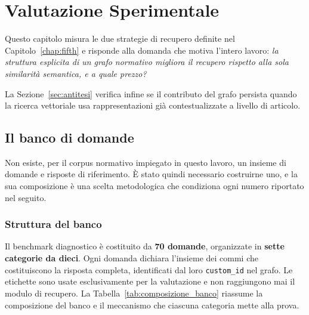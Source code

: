 \chapter{Valutazione Sperimentale}\label{chap:sixth}

\inlineminitoc

Questo capitolo misura le due strategie di recupero definite nel Capitolo~\ref{chap:fifth} e risponde alla domanda che motiva l'intero lavoro: \textit{la struttura esplicita di un grafo normativo migliora il recupero rispetto alla sola similarità semantica, e a quale prezzo?}

La Sezione~\ref{sec:antitesi} verifica infine se il contributo del grafo persista quando la ricerca vettoriale usa rappresentazioni già contestualizzate a livello di articolo.

\section{Il banco di domande}
\label{sec:banco}

Non esiste, per il corpus normativo impiegato in questo lavoro, un insieme di domande e risposte di riferimento. È stato quindi necessario costruirne uno, e la sua composizione è una scelta metodologica che condiziona ogni numero riportato nel seguito.

\subsection{Struttura del banco}

Il benchmark diagnostico è costituito da \textbf{70 domande}, organizzate in \textbf{sette categorie da dieci}. Ogni domanda dichiara l'insieme dei commi che costituiscono la risposta completa, identificati dal loro \texttt{custom\_id} nel grafo. Le etichette sono usate esclusivamente per la valutazione e non raggiungono mai il modulo di recupero. La Tabella~\ref{tab:composizione_banco} riassume la composizione del banco e il meccanismo che ciascuna categoria mette alla prova.

